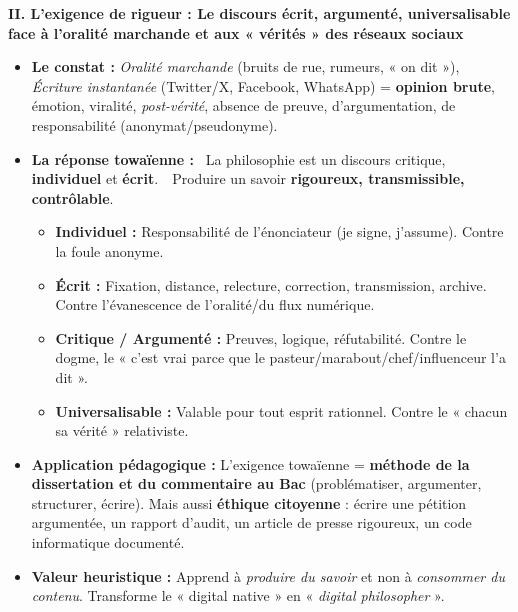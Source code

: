 \documentclass[11pt]{article}
\begin{document}
\begin{corrige}
\textbf{II. L'exigence de rigueur : Le discours écrit, argumenté, universalisable face à l'oralité marchande et aux « vérités » des réseaux sociaux}
\begin{itemize}
\item \textbf{Le constat :} \emph{Oralité marchande} (bruits de rue, rumeurs, « on dit »), \emph{Écriture instantanée} (Twitter/X, Facebook, WhatsApp) = \textbf{opinion brute}, émotion, viralité, \emph{post-vérité}, absence de preuve, d'argumentation, de responsabilité (anonymat/pseudonyme).
\item \textbf{La réponse towaïenne :} \guillemotleft~La philosophie est un discours critique, \textbf{individuel} et \textbf{écrit}.~\guillemotright \guillemotleft~Produire un savoir \textbf{rigoureux, transmissible, contrôlable}.~\guillemotright
\begin{itemize}
\item \textbf{Individuel :} Responsabilité de l'énonciateur (je signe, j'assume). Contre la foule anonyme.
\item \textbf{Écrit :} Fixation, distance, relecture, correction, transmission, archive. Contre l'évanescence de l'oralité/du flux numérique.
\item \textbf{Critique / Argumenté :} Preuves, logique, réfutabilité. Contre le dogme, le « c'est vrai parce que le pasteur/marabout/chef/influenceur l'a dit ».
\item \textbf{Universalisable :} Valable pour tout esprit rationnel. Contre le « chacun sa vérité » relativiste.
\end{itemize}
\item \textbf{Application pédagogique :} L'exigence towaïenne = \textbf{méthode de la dissertation et du commentaire au Bac} (problématiser, argumenter, structurer, écrire). Mais aussi \textbf{éthique citoyenne} : écrire une pétition argumentée, un rapport d'audit, un article de presse rigoureux, un code informatique documenté.
\item \textbf{Valeur heuristique :} Apprend à \emph{produire du savoir} et non à \emph{consommer du contenu}. Transforme le « digital native » en « \emph{digital philosopher} ».
\end{itemize}


\end{corrige}
\end{document}

